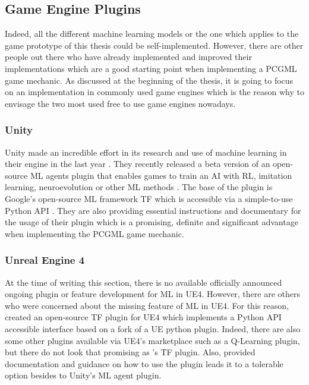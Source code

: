 \documentclass[MGS,Master,english]{twbook}%
\begin{document}
\subsection{Game Engine Plugins} \label{chapter::mlPluginsGameEngines}
Indeed, all the different machine learning models or the one which applies to the game prototype of this thesis could be self-implemented. However, there are other people out there who have already implemented and improved their implementations which are a good starting point when implementing a PCGML game mechanic. As discussed at the beginning of the thesis, it is going to focus on an implementation in commonly used game engines which is the reason why to envisage the two most used free to use game engines nowadays.

\subsubsection{Unity}
Unity made an incredible effort in its research and use of machine learning in their engine in the last year \cite{unity::ml}. They recently released a beta version of an open-source ML agents plugin that enables games to train an AI with \ac{RL}, imitation learning, neuroevolution or other ML methods \cite{unity::mlGithub}. The base of the plugin is Google’s open-source ML framework \acf{TF} \cite{api::tensorFlow} which is accessible via a simple-to-use Python \ac{API} \cite{unity::mlGithub}. They are also providing essential instructions and documentary for the usage of their plugin which is a promising, definite and significant advantage when implementing the PCGML game mechanic.

\subsubsection{Unreal Engine 4}
At the time of writing this section, there is no available officially announced ongoing plugin or feature development for ML in \ac{UE4}. However, there are others who were concerned about the missing feature of ML in UE4. For this reason, \citep{ue4::tensorFlowPlugin} created an open-source \ac{TF} plugin for UE4 which implements a Python API accessible interface based on a fork of a UE python plugin. Indeed, there are also some other plugins available via UE4's marketplace such as a Q-Learning plugin, but there do not look that promising as 's \ac{TF} plugin. Also, provided documentation and guidance on how to use the plugin leads it to a tolerable option besides to Unity’s ML agent plugin.
\end{document}
